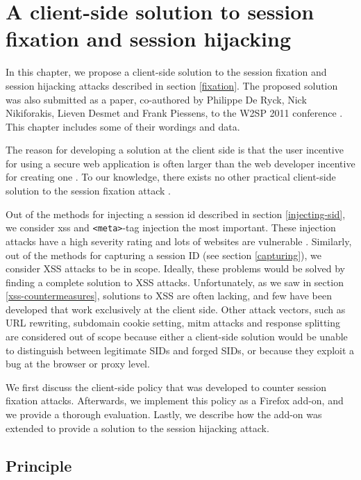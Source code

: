 \chapter{A client-side solution to session fixation and session hijacking}\label{fixation-solution}

In this chapter, we propose a client-side solution to the \gls{session fixation} and \gls{session hijacking} attacks described in section \ref{fixation}. The proposed solution was also submitted as a paper, co-authored by Philippe De Ryck, Nick Nikiforakis, Lieven Desmet and Frank Piessens, to the W2SP 2011 conference \cite{Bonne2011}. This chapter includes some of their wordings and data.

The reason for developing a solution at the client side is that the user incentive for using a secure web application is often larger than the web developer incentive for creating one \cite{Johns2011}. To our knowledge, there exists no other practical client-side solution to the session fixation attack \cite{Bonne2011}.

Out of the methods for injecting a \gls{session id} described in section \ref{injecting-sid}, we consider \gls{xss} and \texttt{<meta>}-tag injection the most important. These injection attacks have a high severity rating \cite{Williams2010} and lots of websites are vulnerable \cite{Brown2010}. Similarly, out of the methods for capturing a session ID (see section \ref{capturing}), we consider XSS attacks to be in scope. Ideally, these problems would be solved by finding a complete solution to XSS attacks. Unfortunately, as we saw in section \ref{xss-countermeasures}, solutions to XSS are often lacking, and few have been developed that work exclusively at the client side. Other attack vectors, such as URL rewriting, subdomain cookie setting, \gls{mitm} attacks and response splitting are considered out of scope because either a client-side solution would be unable to distinguish between legitimate SIDs and forged SIDs, or because they exploit a bug at the browser or proxy level.

We first discuss the client-side policy that was developed to counter session fixation attacks. Afterwards, we implement this policy as a Firefox add-on, and we provide a thorough evaluation. Lastly, we describe how the add-on was extended to provide a solution to the session hijacking attack.

\section{Principle}\label{principle}

